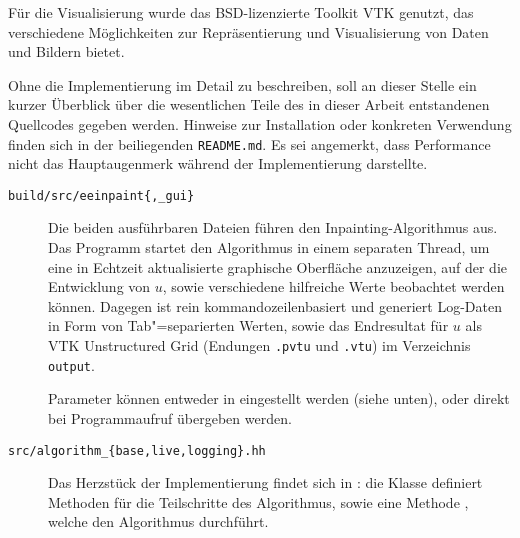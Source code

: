 \documentclass{mythesis}
\begin{document}
Für die Visualisierung wurde das BSD-lizenzierte Toolkit VTK \cite{schroeder2004visualization} genutzt, das verschiedene Möglichkeiten zur Repräsentierung und Visualisierung von Daten und Bildern bietet.

Ohne die Implementierung im Detail zu beschreiben, soll an dieser Stelle ein kurzer Überblick über die wesentlichen Teile des in dieser Arbeit entstandenen Quellcodes gegeben werden.
Hinweise zur Installation oder konkreten Verwendung finden sich in der beiliegenden \texttt{README.md}.
Es sei angemerkt, dass Performance nicht das Hauptaugenmerk während der Implementierung darstellte.

\begin{description}
    \item[\texttt{build/src/eeinpaint\{,_gui\}}]
	Die beiden ausführbaren Dateien führen den Inpainting-Algorithmus aus.
 	Das Programm  startet den Algorithmus in einem separaten Thread, um eine in Echtzeit aktualisierte graphische Oberfläche anzuzeigen, auf der die Entwicklung von $u$, sowie verschiedene hilfreiche Werte beobachtet werden können.
	Dagegen ist  rein kommandozeilenbasiert und generiert Log-Daten in Form von Tab"=separierten Werten, sowie das Endresultat für $u$ als VTK Unstructured Grid (Endungen \texttt{.pvtu} und \texttt{.vtu}) im Verzeichnis \texttt{output}.

	Parameter können entweder in  eingestellt werden (siehe unten), oder direkt bei Programmaufruf übergeben werden.
    \item[\texttt{src/algorithm_\{base,live,logging\}.hh}]
	Das Herzstück der Implementierung findet sich in : die Klasse  definiert Methoden für die Teilschritte des Algorithmus, sowie eine Methode , welche den Algorithmus durchführt.


\end{description}
\end{document}
